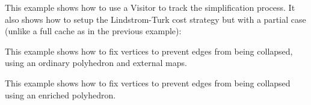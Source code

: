 This example shows how to use a Visitor to track the simplification process. It also shows how to setup the Lindstrom-Turk cost strategy but with a partial case (unlike a full cache as in the previous example):

This example shows how to fix vertices to prevent edges from being collapsed, using an ordinary polyhedron and external maps.

This example shows how to fix vertices to prevent edges from being collapsed using an enriched polyhedron.



